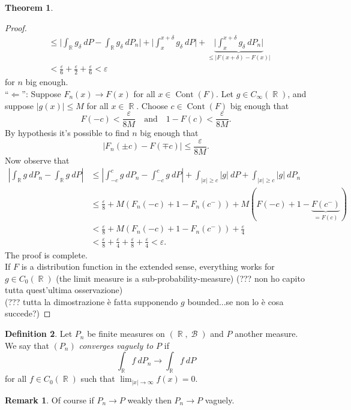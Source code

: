 \documentclass[12pt,a4paper]{report}
\theoremstyle{definition}
\newtheorem{theorem}{Theorem}[chapter] %
\newtheorem{definition}[theorem]{Definition}
\newtheorem*{remark}{Remark}
\theoremstyle{num.custom-title}
\DeclareMathOperator{\B}{\mathcal{B}}
\DeclareMathOperator{\R}{\mathbb{R}}
\DeclareMathOperator{\pmi}{\Leftarrow}
\DeclareMathOperator{\Cont}{Cont}
\renewcommand{\epsilon}{\varepsilon}
\renewcommand{\1}{\mathbbm{1}}
\begin{document}
\begin{theorem}
\begin{proof}
\begin{align*}
&\leq \Big| \int_{\R} g_\delta \ dP - \int_{\R} g_\delta \ dP_n \Big| + \Big| \int_x^{x+\delta} g_\delta \ dP \Big| + \underbrace{\Big| \int_x^{x+\delta} g_\delta \ dP_n \Big|}_{\leq |F(x+\delta)-F(x)|} \\
&< \frac{\epsilon}{6} + \frac{\epsilon}{2} + \frac{\epsilon}{6} < \epsilon
\end{align*}
for $n$ big enough.
\\[6pt]
``$\pmi$'': Suppose $F_n(x) \to F(x)$ for all $x \in \Cont(F)$. Let $g \in C_\infty(\R)$, and suppose $|g(x)| \leq M$ for all $x \in \R$. Choose $c \in \Cont(F)$ big enough that
\[
F(-c) < \frac{\epsilon}{8M} \quad \text{and} \quad 1-F(c) < \frac{\epsilon}{8M}.
\]
By hypothesis it's possible to find $n$ big enough that
\[
|F_n(\pm c) - F(\mp c)| \leq \frac{\epsilon}{8M}.
\]
Now observe that
\begin{align*}
\left| \int_{\R} g \ dP_n - \int_{\R} g \ dP \right|
&\leq \left| \int_{-c}^c g \ dP_n - \int_{-c}^c g \ dP \right| + \int_{|x| \geq c} |g| \ dP + \int_{|x| \geq c} |g| \ dP_n \\
&\leq \frac{\epsilon}{8} + M(F_n(-c)+1-F_n(c^-)) + M(F(-c)+1-\underbrace{F(c^-)}_{=F(c)}) \\
&< \frac{\epsilon}{8} + M(F_n(-c) + 1 - F_n(c^-)) + \frac{\epsilon}{4} \\
&< \frac{\epsilon}{8} + \frac{\epsilon}{4} + \frac{\epsilon}{8} + \frac{\epsilon}{4} < \epsilon.
\end{align*}
The proof is complete.\\
If $F$ is a distribution function in the extended sense, everything works for $g \in C_0(\R)$ (the limit measure is a sub-probability-measure) (??? non ho capito tutta quest'ultima osservazione)\\
(??? tutta la dimostrazione è fatta supponendo $g$ bounded...se non lo è cosa succede?)
\end{proof}
\end{theorem}

\begin{definition}
Let $P_n$ be finite measures on $(\R,\B)$ and $P$ another measure. We say that $(P_n)$ \emph{converges vaguely to $P$} if 
\[
\int_{\R} f \ dP_n \to \int_{\R} f \ dP
\]
for all $f \in C_0(\R)$ such that $\lim_{|x| \to \infty} f(x) = 0$.
\end{definition}

\begin{remark}
Of course if $P_n \to P$ weakly then $P_n \to P$ vaguely.
\end{remark}
\end{document}
